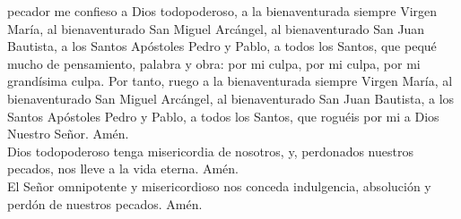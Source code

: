  pecador me confieso a Dios todopoderoso, a la bienaventurada siempre Virgen María, al bienaventurado San Miguel Arcángel,
al bienaventurado San Juan Bautista, a los Santos Apóstoles Pedro y Pablo, a todos los Santos, que pequé mucho
de pensamiento, palabra y obra: por mi culpa, por mi culpa, por mi grandísima culpa. Por tanto, ruego a la bienaventurada
siempre Virgen María, al bienaventurado San Miguel Arcángel, al bienaventurado San Juan Bautista, a los Santos Apóstoles
Pedro y Pablo, a todos los Santos, que roguéis por mi a Dios Nuestro Señor. Amén.\\
Dios todopoderoso tenga misericordia de nosotros, y, perdonados nuestros pecados, nos lleve a la vida eterna. Amén.\\
El Señor omnipotente y misericordioso nos conceda indulgencia, absolución y perdón de nuestros pecados. Amén.